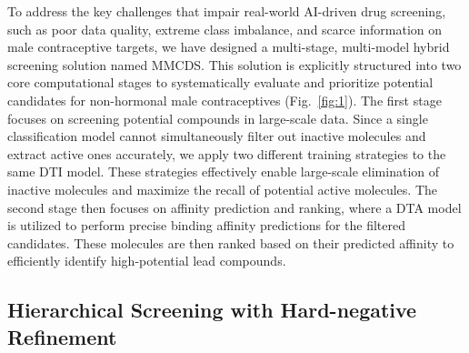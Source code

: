 \documentclass[preprint,12pt]{elsarticle}
\theoremstyle{plain}
\theoremstyle{definition}
\theoremstyle{remark}
\begin{document}
To address the key challenges that impair real-world AI-driven drug screening, such as poor data quality, extreme class imbalance, and scarce information on male contraceptive targets, we have designed a multi-stage, multi-model hybrid screening solution named MMCDS. This solution is explicitly structured into two core computational stages to systematically evaluate and prioritize potential candidates for non-hormonal male contraceptives (Fig.~\ref{fig:1}). The first stage focuses on screening potential compounds in large-scale data. Since a single classification model cannot simultaneously filter out inactive molecules and extract active ones accurately, we apply two different training strategies to the same DTI model. These strategies effectively enable large-scale elimination of inactive molecules and maximize the recall of potential active molecules. The second stage then focuses on affinity prediction and ranking, where a DTA model is utilized to perform precise binding affinity predictions for the filtered candidates. These molecules are then ranked based on their predicted affinity to efficiently identify high-potential lead compounds.



\subsection*{Hierarchical Screening with Hard-negative Refinement} 


\end{document}
